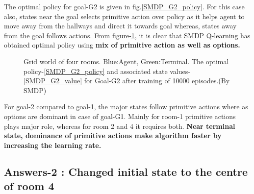 \documentclass[preprint,12pt]{elsarticle}
\begin{document}
The optimal policy for goal-G2 is given in fig.\ref{SMDP_G2_policy}. For this case also, states near the goal selects primitive action over policy as it helps agent to move away from the hallways and direct it towards goal whereas, states away from the goal follows actions. From figure-\ref{fig:SMDP_G2}, it is clear that SMDP Q-learning has obtained optimal policy using \textbf{mix of primitive action as well as options.}

\begin{figure}[H]
	\centering  
	\caption{Grid world of four rooms.  Blue:Agent, Green:Terminal. The optimal policy-\ref{SMDP_G2_policy} and associated state values-\ref{SMDP_G2_value} for Goal-G2 after training of 10000 episodes.(By SMDP)}
	\label{fig:SMDP_G2}
\end{figure}
 For goal-2 compared to goal-1, the major states follow primitive actions where as options are dominant in case of goal-G1. Mainly for room-1 primitive actions plays major role, whereas for room 2 and 4 it requires both.  \textbf{Near terminal state, dominance of primitive actions make algorithm faster by increasing the learning rate.}

\newpage

\subsection{Answers-2 : Changed initial state to the centre of room 4}
\end{document}
